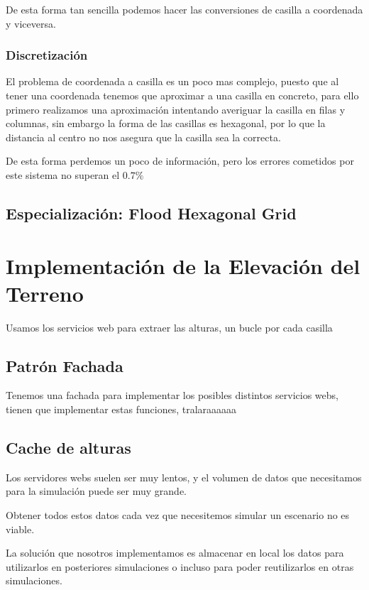 De esta forma tan sencilla podemos hacer las conversiones de casilla a
coordenada y viceversa.
\subsubsection*{Discretización}
El problema de coordenada a casilla es un poco mas complejo, puesto que al
tener una coordenada tenemos que aproximar a una casilla en concreto, para ello
primero realizamos una aproximación intentando averiguar la casilla en filas y
columnas, sin embargo la forma de las casillas es hexagonal, por lo que la
distancia al centro  no nos asegura que la casilla sea la correcta.

De esta forma perdemos un poco de información, pero los errores cometidos por
este sistema no superan el \begin{math} 0.7\% \end{math}

\subsection*{Especialización: Flood Hexagonal Grid}
\section*{Implementación de la Elevación del Terreno}
Usamos los servicios web para extraer las alturas, un bucle por cada casilla
\subsection*{Patrón Fachada} %
Tenemos una fachada para implementar los posibles distintos servicios webs,
tienen que implementar estas funciones, tralaraaaaaa
\subsection*{Cache de alturas}
Los servidores webs suelen ser muy lentos, y el volumen de datos que
necesitamos para la simulación puede ser muy grande.

Obtener todos estos datos cada vez que necesitemos simular un escenario no es
viable.

La solución que nosotros implementamos es almacenar en local los datos para
utilizarlos en posteriores simulaciones o incluso para poder reutilizarlos en
otras simulaciones.

